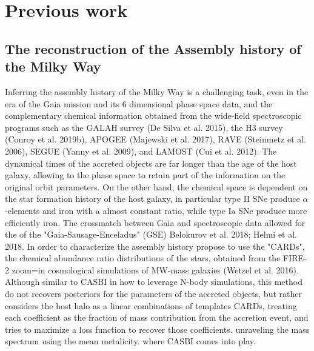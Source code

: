 \chapter{Previous work}

\section{The reconstruction of the Assembly history of the Milky Way}
Inferring the assembly history of the Milky Way is a challenging task, even in the era of the Gaia mission and its 6 dimensional 
phase space data, and the complementary chemical information obtained from the wide-field spectroscopic programs such as the GALAH survey
(De Silva et al. 2015), the H3 survey (Conroy et al. 2019b), APOGEE (Majewski et al. 2017), RAVE (Steinmetz et al. 2006),  SEGUE (Yanny et al. 2009), and 
LAMOST (Cui et al. 2012). The dynamical times of the accreted objects are far longer than the age of the host galaxy, allowing to the 
phase space to retain part of the information on the original orbit parameters. On the other hand, the chemical space is dependent on the star formation history 
of the host galaxy, in particular type II SNe produce $\alpha$-elements and iron with a almost constant ratio, while type Ia SNe produce more efficiently iron. 
The crossmatch between Gaia and spectroscopic data allowed for the of the "Gaia-Sausage-Enceladus" (GSE) Belokurov et al. 2018; Helmi et al. 2018. In order to 
characterize the assembly history \cite{cunninghamReadingCARDsImprint2022} propose to use the "CARDs", the chemical abundance ratio distributions of the
stars, obtained from the FIRE-2 zoom=in cosmological simulations of MW-mass galaxies (Wetzel et al. 2016). Although similar to CASBI in how to leverage 
N-body simulations, this method do not recovers posteriors for the parameters of the accreted objects, but rather considers the host halo as a linear 
combinations of templates CARDs, treating each coefficient as the fraction of mass contribution from the accretion event, and tries to maximize a loss 
function to recover those coefficients.  
\cite{deasonUnravellingMassSpectrum2023} unraveling the mass spectrum using the mean metalicity.
where CASBI comes into play.
